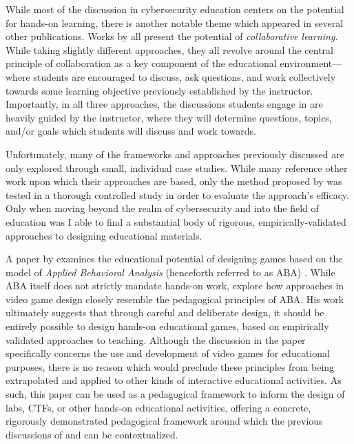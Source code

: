 
    While most of the discussion in cybersecurity education centers on the potential for hands-on learning, there is another notable theme which appeared in several other publications. %
Works by \textcite{P-Deshpande, C-Kussmaul,B-Payne} all present the potential of \emph{collaborative learning}. %
While taking slightly different approaches, they all revolve around the central principle of collaboration as a key component of the educational environment---%
where students are encouraged to discuss, ask questions, and work collectively towards some learning objective previously established by the instructor. %
Importantly, in all three approaches, the discussions students engage in are heavily guided by the instructor, where they will determine questions, topics, and/or goals which students will discuss and work towards. 



    Unfortunately, many of the frameworks and approaches previously discussed are only explored through small, individual case studies. %
While many reference other work upon which their approaches are based, only the method proposed by \citeauthor{P-Deshpande} was tested in a thorough controlled study in order to evaluate the approach's efficacy. %
Only when moving beyond the realm of cybersecurity and into the field of education was I able to find a substantial body of rigorous, empirically-validated approaches to designing educational materials. 

    A paper by \citeauthor{C-Linehan} examines the educational potential of designing games based on the model of \emph{Applied Behavioral Analysis} (henceforth referred to as ABA) \cite{C-Linehan}. %
While ABA itself does not strictly mandate hands-on work, \citeauthor{C-Linehan} explore how approaches in video game design closely resemble the pedagogical principles of ABA. His work ultimately suggests that through careful and deliberate design, it should be entirely possible to design hands-on educational games, based on empirically validated approaches to teaching. %
Although the discussion in the paper specifically concerns the use and development of video games for educational purposes, there is no reason which would preclude these principles from being extrapolated and applied to other kinds of interactive educational activities. %
As such, this paper can be used as a pedagogical framework to inform the design of labs, CTFs, or other hands-on educational activities, offering a concrete, rigorously demonstrated pedagogical framework around which the previous discussions of \citeauthor{J-Sweller} and \citeauthor{R-Weiss} can be contextualized. 


